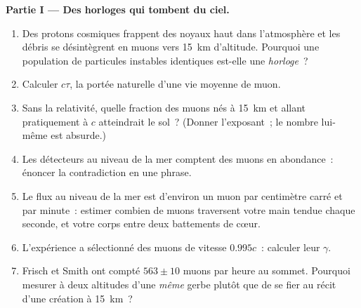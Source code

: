 \begin{problem}
\medskip\noindent\textbf{Partie I --- Des horloges qui tombent du ciel.}
\begin{enumerate}
  \item Des protons cosmiques frappent des noyaux haut dans
        l'atmosphère et les débris se désintègrent en muons vers
        \qty{15}{km} d'altitude. Pourquoi une population de particules
        instables identiques est-elle une \emph{horloge}~?
  \item Calculer $c\tau$, la portée naturelle d'une vie moyenne de
        muon.
  \item Sans la relativité, quelle fraction des muons nés à
        \qty{15}{km} et allant pratiquement à $c$ atteindrait le sol~?
        (Donner l'exposant~; le nombre lui-même est absurde.)
  \item Les détecteurs au niveau de la mer comptent des muons en
        abondance~: énoncer la contradiction en une phrase.
  \item Le flux au niveau de la mer est d'environ un muon par
        centimètre carré et par minute~: estimer combien de muons
        traversent votre main tendue chaque seconde, et votre corps
        entre deux battements de cœur.
  \item L'expérience a sélectionné des muons de vitesse $0.995c$~:
        calculer leur $\gamma$.
  \item Frisch et Smith ont compté $563 \pm 10$ muons par heure au
        sommet. Pourquoi mesurer à deux altitudes d'une \emph{même}
        gerbe plutôt que de se fier au récit d'une création à
        \qty{15}{km}~?
\end{enumerate}


\end{problem}
